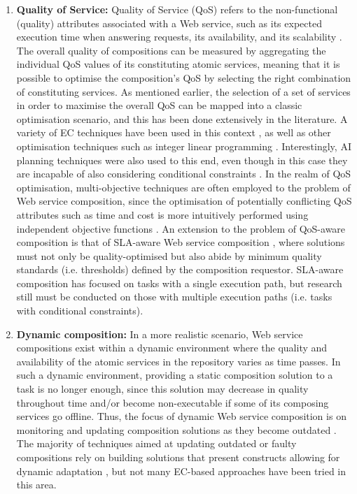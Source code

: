\begin{enumerate}
 \item \textbf{Quality of Service:} Quality of Service (QoS) refers to the non-functional (quality) attributes associated with a Web service, such as its expected execution time when answering requests, its availability, and its scalability \cite{ko2008quality}. The overall quality of compositions can be measured by aggregating the individual QoS values of its constituting atomic services, meaning that it is possible to optimise the composition's QoS by selecting the right combination of constituting services. As mentioned earlier, the selection of a set of services in order to maximise the overall QoS can be mapped into a classic optimisation scenario, and this has been done extensively in the literature. A variety of EC techniques have been used in this context \cite{wang2012survey}, as well as other optimisation techniques such as integer linear programming \cite{yoo2008web}. Interestingly, AI planning techniques were also used to this end, even though in this case they are incapable of also considering conditional constraints \cite{deng2013efficient}. In the realm of QoS optimisation, multi-objective techniques are often employed to the problem of Web service composition, since the optimisation of potentially conflicting QoS attributes such as time and cost is more intuitively performed using independent objective functions \cite{liu2005dynamic}. An extension to the problem of QoS-aware composition is that of SLA-aware Web service composition \cite{yin2014hybrid}, where solutions must not only be quality-optimised but also abide by minimum quality standards (i.e. thresholds) defined by the composition requestor. SLA-aware composition has focused on tasks with a single execution path, but research still must be conducted on those with multiple execution paths (i.e. tasks with conditional constraints).
 
 \item \textbf{Dynamic composition:} In a more realistic scenario, Web service compositions exist within a dynamic environment where the quality and availability of the atomic services in the repository varies as time passes. In such a dynamic environment, providing a static composition solution to a task is no longer enough, since this solution may decrease in quality throughout time and/or become non-executable if some of its composing services go offline. Thus, the focus of dynamic Web service composition is on monitoring and updating composition solutions as they become outdated \cite{li2014fault}. The majority of techniques aimed at updating outdated or faulty compositions rely on building solutions that present constructs allowing for dynamic adaptation \cite{alferez2014dynamic}, but not many EC-based approaches have been tried in this area.
\end{enumerate}

